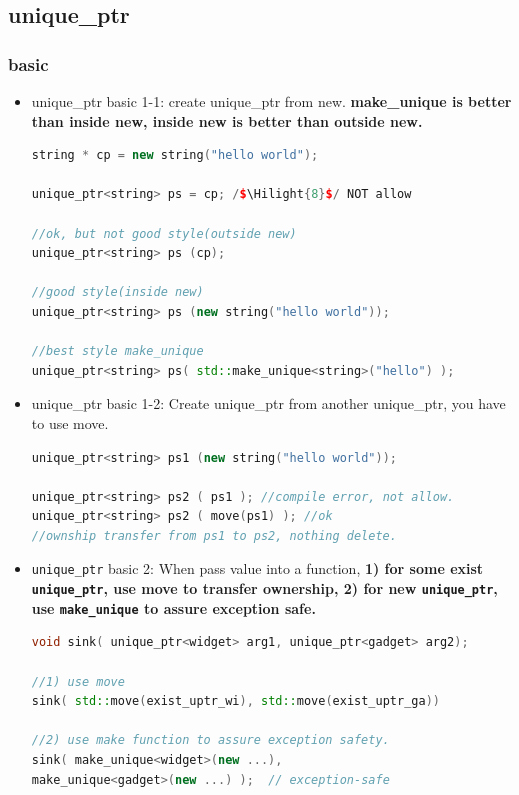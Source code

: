 \documentclass[a4paper,12pt,twoside]{book}
\newcommand{\Hilight}[1]{\makebox[0pt][l]{\color{yellow}\rule[-3pt]{#1em}{11pt}}}
\begin{document}
\subsection{unique\_ptr}

\subsubsection{basic}
\begin{itemize}

\item unique\_ptr basic 1-1: create unique\_ptr from new.    \textbf{make\_unique is better than inside new, inside new is better than outside new.}
\begin{lstlisting}[frame=single, language=c++]
string * cp = new string("hello world");

unique_ptr<string> ps = cp; /$\Hilight{8}$/ NOT allow

//ok, but not good style(outside new)
unique_ptr<string> ps (cp);

//good style(inside new)
unique_ptr<string> ps (new string("hello world"));

//best style make_unique
unique_ptr<string> ps( std::make_unique<string>("hello") );
\end{lstlisting}

\item unique\_ptr basic 1-2: Create unique\_ptr from another unique\_ptr, you have to use move.
\begin{lstlisting}[frame=single, language=c++]
unique_ptr<string> ps1 (new string("hello world"));

unique_ptr<string> ps2 ( ps1 ); //compile error, not allow.
unique_ptr<string> ps2 ( move(ps1) ); //ok
//ownship transfer from ps1 to ps2, nothing delete.
\end{lstlisting}

\item \texttt{unique\_ptr} basic 2: When pass value into a function, \textbf{1) for some exist \texttt{unique\_ptr}, use move to transfer ownership, 2) for new \texttt{unique\_ptr}, use \texttt{make\_unique} to assure exception safe.}

\begin{lstlisting}[frame=single, language=c++]
void sink( unique_ptr<widget> arg1, unique_ptr<gadget> arg2);

//1) use move
sink( std::move(exist_uptr_wi), std::move(exist_uptr_ga))

//2) use make function to assure exception safety.
sink( make_unique<widget>(new ...),
make_unique<gadget>(new ...) );  // exception-safe
\end{lstlisting}



\end{itemize}
\end{document}
